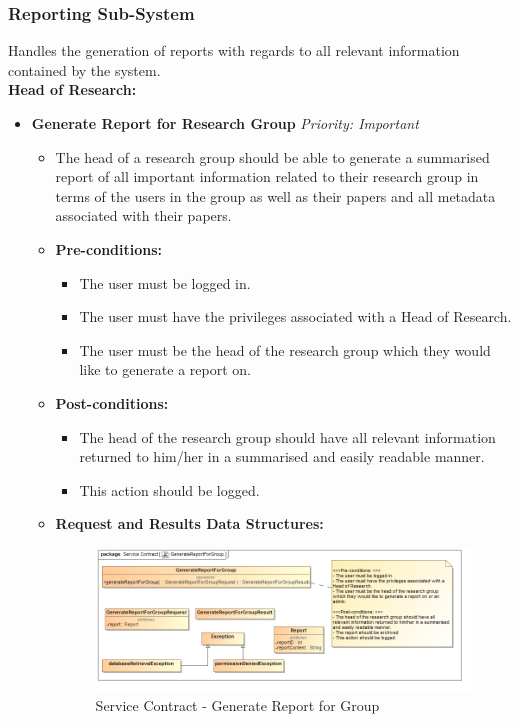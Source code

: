 \documentclass{article}
\begin{document}
			\cleardoublepage
			\subsubsection{Reporting Sub-System}\label{subsubsec:report}
				Handles the generation of reports with regards to all relevant information contained by the system.\\
				[3mm]
				\textbf{Head of Research:}
				\begin{itemize}
					\item \textbf{Generate Report for Research Group} \hfill \textit{Priority: Important}
					\begin{itemize}
						\item The head of a research group should be able to generate a summarised report of all important information related to their research group in terms of the users in the group as well as their papers and all metadata associated with their papers.
						\item \textbf{Pre-conditions:}
						\begin{itemize}
							\item The user must be logged in.
							\item The user must have the privileges associated with a Head of Research.
							\item The user must be the head of the research group which they would like to generate a report on.
						\end{itemize}
						\item \textbf{Post-conditions:}
						\begin{itemize}
							\item The head of the research group should have all relevant information returned to him/her in a summarised and easily readable manner.
							\item This action should be logged.
						\end{itemize}
						\item \textbf{Request and Results Data Structures:}
						\begin{figure}[H]
							\includegraphics[width=\linewidth]{../Diagrams/ServiceContracts/Reporting subsystem/GenerateReportForGroup.jpg}
							\caption{Service Contract - Generate Report for Group}
						\end{figure}
					\end{itemize}
				\end{itemize}
				
\end{document}
